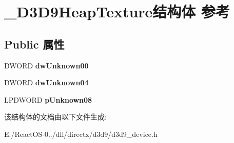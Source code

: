 \hypertarget{struct___d3_d9_heap_texture}{}\section{\+\_\+\+D3\+D9\+Heap\+Texture结构体 参考}
\label{struct___d3_d9_heap_texture}
\subsection*{Public 属性}
\begin{DoxyCompactItemize}
\item 
\mbox{\label{struct___d3_d9_heap_texture_ad4e9851caa56e03127fe4678199add68}} 
D\+W\+O\+RD {\bfseries dw\+Unknown00}
\item 
\mbox{\label{struct___d3_d9_heap_texture_ac0fd397e76aeda46820ee2d0e42e08cd}} 
D\+W\+O\+RD {\bfseries dw\+Unknown04}
\item 
\mbox{\label{struct___d3_d9_heap_texture_a6eede2c3856a44d79d3c8194d685b778}} 
L\+P\+D\+W\+O\+RD {\bfseries p\+Unknown08}
\end{DoxyCompactItemize}


该结构体的文档由以下文件生成\+:\begin{DoxyCompactItemize}
\item 
E\+:/\+React\+O\+S-\/0../dll/directx/d3d9/d3d9\+\_\+device.\+h\end{DoxyCompactItemize}
